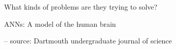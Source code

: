 \begin{frame}
    
    What kinds of problems are they trying to solve?

\end{frame}



\begin{frame}{ANNs: A model of the human brain}
    
    \begin{figure}
       \centering
    \end{figure}

    \footnotesize{
    \hspace{5em} -- source: Dartmouth undergraduate journal of science}

\end{frame}


